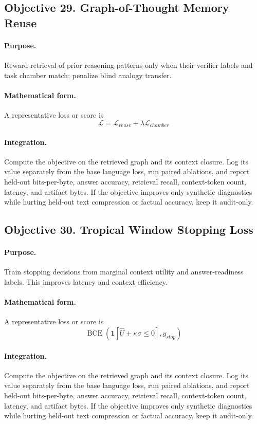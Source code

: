\documentclass[11pt]{article}
\theoremstyle{definition}
\theoremstyle{remark}
\begin{document}
\subsection{Objective 29. Graph-of-Thought Memory Reuse}
\paragraph{Purpose.} Reward retrieval of prior reasoning patterns only when their verifier labels and task chamber match; penalize blind analogy transfer.

\paragraph{Mathematical form.} A representative loss or score is
\[
    \mathcal L=\mathcal L_{reuse}+\lambda\mathcal L_{chamber}
\]

\paragraph{Integration.} Compute the objective on the retrieved graph and its context closure. Log its value separately from the base language loss, run paired ablations, and report held-out bits-per-byte, answer accuracy, retrieval recall, context-token count, latency, and artifact bytes. If the objective improves only synthetic diagnostics while hurting held-out text compression or factual accuracy, keep it audit-only.


\subsection{Objective 30. Tropical Window Stopping Loss}
\paragraph{Purpose.} Train stopping decisions from marginal context utility and answer-readiness labels. This improves latency and context efficiency.

\paragraph{Mathematical form.} A representative loss or score is
\[
    \operatorname{BCE}(\mathbf 1[\widehat U+\kappa\sigma\le0],y_{stop})
\]

\paragraph{Integration.} Compute the objective on the retrieved graph and its context closure. Log its value separately from the base language loss, run paired ablations, and report held-out bits-per-byte, answer accuracy, retrieval recall, context-token count, latency, and artifact bytes. If the objective improves only synthetic diagnostics while hurting held-out text compression or factual accuracy, keep it audit-only.
\end{document}
